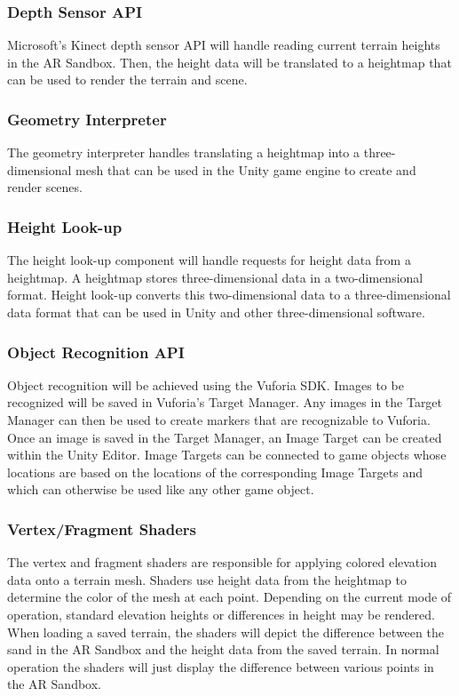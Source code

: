 \documentclass[letterpaper, 10pt, onecolumn, draftclsnofoot]{IEEEtran}
\begin{document}
        \subsubsection{Depth Sensor API}
            Microsoft's Kinect depth sensor API will handle reading current terrain heights in the AR Sandbox. Then, the height data will be  translated to a heightmap that can be used to render the terrain and scene.
       
        \subsubsection{Geometry Interpreter}
            The geometry interpreter handles translating a heightmap into a three-dimensional mesh that can be used in the Unity game engine to create and render scenes.  
        
        \subsubsection{Height Look-up}
            The height look-up component will handle requests for height data from a heightmap. A heightmap stores three-dimensional data in a two-dimensional format. Height look-up converts this two-dimensional data to a three-dimensional data format that can be used in Unity and other three-dimensional software.
       
        \subsubsection{Object Recognition API}
            Object recognition will be achieved using the Vuforia SDK. Images to be recognized will be saved in Vuforia's Target Manager. Any images in the Target Manager can then be used to create markers that are recognizable to Vuforia. Once an image is saved in the Target Manager, an Image Target can be created within the Unity Editor. Image Targets can be connected to game objects whose locations are based on the locations of the corresponding Image Targets and which can otherwise be used like any other game object.
       
        \subsubsection{Vertex/Fragment Shaders}
            The vertex and fragment shaders are responsible for applying colored elevation data onto a terrain mesh. Shaders use height data from the heightmap to determine the color of the mesh at each point. Depending on the current mode of operation, standard elevation heights or differences in height may be rendered. When loading a saved terrain, the shaders will depict the difference between the sand in the AR Sandbox and the height data from the saved terrain. In normal operation the shaders will just display the difference between various points in the AR Sandbox.
       
\end{document}
